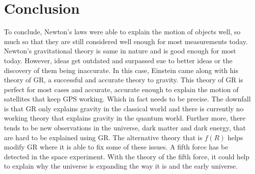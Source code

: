 \documentclass[a4paper]{article}
\begin{document}
\section{Conclusion}

To conclude, Newton's laws were able to explain the motion of objects well, so much so that they are still considered well enough for most measurements today. Newton's gravitational theory is same in nature and is good enough for most today. However, ideas get outdated and surpassed sue to better ideas or the discovery of them being inaccurate. In this case, Einstein came along with his theory of GR, a successful and accurate theory to gravity. This theory of GR is perfect for most cases and accurate, accurate enough to explain the motion of satellites that keep GPS working. Which in fact needs to be precise. The downfall is that GR only explains gravity in the classical world and there is currently no working theory that explains gravity in the quantum world. Further more, there tends to be new observations in the universe, dark matter and dark energy, that are hard to be explained using GR. The alternative theory that is $f(R)$ helps modify GR where it is able to fix some of these issues. A fifth force has be detected in the space experiment. With the theory of the fifth force, it could help to explain why the universe is expanding the way it is and the early universe. 

\nocite{*}


\end{document}
